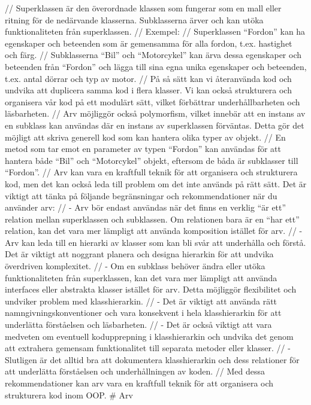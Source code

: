 // Superklassen är den överordnade klassen som fungerar som en mall
eller ritning för de nedärvande klasserna. Subklasserna ärver och kan
utöka funktionaliteten från superklassen. // Exempel: // Superklassen
``Fordon'' kan ha egenskaper och beteenden som är gemensamma för alla
fordon, t.ex. hastighet och färg. // Subklasserna ``Bil'' och
``Motorcykel'' kan ärva dessa egenskaper och beteenden från ``Fordon''
och lägga till sina egna unika egenskaper och beteenden, t.ex. antal
dörrar och typ av motor. // På så sätt kan vi återanvända kod och
undvika att duplicera samma kod i flera klasser. Vi kan också
strukturera och organisera vår kod på ett modulärt sätt, vilket
förbättrar underhållbarheten och läsbarheten. // Arv möjliggör också
polymorfism, vilket innebär att en instans av en subklass kan användas
där en instans av superklassen förväntas. Detta gör det möjligt att
skriva generell kod som kan hantera olika typer av objekt. // En metod
som tar emot en parameter av typen ``Fordon'' kan användas för att
hantera både ``Bil'' och ``Motorcykel'' objekt, eftersom de båda är
subklasser till ``Fordon''. // Arv kan vara en kraftfull teknik för att
organisera och strukturera kod, men det kan också leda till problem om
det inte används på rätt sätt. Det är viktigt att tänka på följande
begränsningar och rekommendationer när du använder arv: // - Arv bör
endast användas när det finns en verklig ``är ett'' relation mellan
superklassen och subklassen. Om relationen bara är en ``har ett''
relation, kan det vara mer lämpligt att använda komposition istället för
arv. // - Arv kan leda till en hierarki av klasser som kan bli svår att
underhålla och förstå. Det är viktigt att noggrant planera och designa
hierarkin för att undvika överdriven komplexitet. // - Om en subklass
behöver ändra eller utöka funktionaliteten från superklassen, kan det
vara mer lämpligt att använda interfaces eller abstrakta klasser
istället för arv. Detta möjliggör flexibilitet och undviker problem med
klasshierarkin. // - Det är viktigt att använda rätt
namngivningskonventioner och vara konsekvent i hela klasshierarkin för
att underlätta förståelsen och läsbarheten. // - Det är också viktigt
att vara medveten om eventuell kodupprepning i klasshierarkin och
undvika det genom att extrahera gemensam funktionalitet till separata
metoder eller klasser. // - Slutligen är det alltid bra att dokumentera
klasshierarkin och dess relationer för att underlätta förståelsen och
underhållningen av koden. // Med dessa rekommendationer kan arv vara en
kraftfull teknik för att organisera och strukturera kod inom OOP. \# Arv

